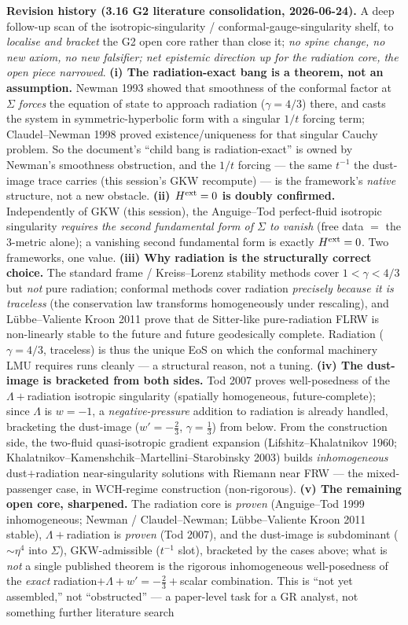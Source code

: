 \documentclass[11pt]{article}
\begin{document}
\smallskip\noindent\textbf{Revision history (3.16 G2 literature consolidation, 2026-06-24).} A deep follow-up scan of the isotropic-singularity / conformal-gauge-singularity shelf, to \emph{localise and bracket} the G2 open core rather than close it; \emph{no spine change, no new axiom, no new falsifier; net epistemic direction up for the radiation core, the open piece narrowed}. \textbf{(i) The radiation-exact bang is a theorem, not an assumption.} Newman 1993 showed that smoothness of the conformal factor at $\Sigma$ \emph{forces} the equation of state to approach radiation ($\gamma=4/3$) there, and casts the system in symmetric-hyperbolic form with a singular $1/t$ forcing term; Claudel--Newman 1998 proved existence/uniqueness for that singular Cauchy problem. So the document's ``child bang is radiation-exact'' is owned by Newman's smoothness obstruction, and the $1/t$ forcing --- the same $t^{-1}$ the dust-image trace carries (this session's GKW recompute) --- is the framework's \emph{native} structure, not a new obstacle. \textbf{(ii) $H^{\rm ext}=0$ is doubly confirmed.} Independently of GKW (this session), the Anguige--Tod perfect-fluid isotropic singularity \emph{requires the second fundamental form of $\Sigma$ to vanish} (free data $=$ the 3-metric alone); a vanishing second fundamental form is exactly $H^{\rm ext}=0$. Two frameworks, one value. \textbf{(iii) Why radiation is the structurally correct choice.} The standard frame / Kreiss--Lorenz stability methods cover $1<\gamma<4/3$ but \emph{not} pure radiation; conformal methods cover radiation \emph{precisely because it is traceless} (the conservation law transforms homogeneously under rescaling), and L\"ubbe--Valiente Kroon 2011 prove that de Sitter-like pure-radiation FLRW is non-linearly stable to the future and future geodesically complete. Radiation ($\gamma=4/3$, traceless) is thus the unique EoS on which the conformal machinery LMU requires runs cleanly --- a structural reason, not a tuning. \textbf{(iv) The dust-image is bracketed from both sides.} Tod 2007 proves well-posedness of the $\Lambda+$radiation isotropic singularity (spatially homogeneous, future-complete); since $\Lambda$ is $w=-1$, a \emph{negative-pressure} addition to radiation is already handled, bracketing the dust-image ($w'=-\tfrac23$, $\gamma=\tfrac13$) from below. From the construction side, the two-fluid quasi-isotropic gradient expansion (Lifshitz--Khalatnikov 1960; Khalatnikov--Kamenshchik--Martellini--Starobinsky 2003) builds \emph{inhomogeneous} dust$+$radiation near-singularity solutions with Riemann near FRW --- the mixed-passenger case, in WCH-regime construction (non-rigorous). \textbf{(v) The remaining open core, sharpened.} The radiation core is \emph{proven} (Anguige--Tod 1999 inhomogeneous; Newman / Claudel--Newman; L\"ubbe--Valiente Kroon 2011 stable), $\Lambda+$radiation is \emph{proven} (Tod 2007), and the dust-image is subdominant ($\sim\eta^4$ into $\Sigma$), GKW-admissible ($t^{-1}$ slot), bracketed by the cases above; what is \emph{not} a single published theorem is the rigorous inhomogeneous well-posedness of the \emph{exact} radiation$+\Lambda+w'{=}{-}\tfrac23+$scalar combination. This is ``not yet assembled,'' not ``obstructed'' --- a paper-level task for a GR analyst, not something further literature search 
\end{document}
